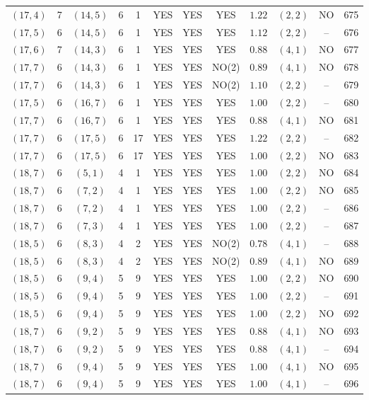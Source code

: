 \begin{longtable}{|c|c|c|c|c|c|c|c|c|c|c|c|}
$(17,4)$ & 7 & $(14,5)$ & 6 & 1 & YES & YES & YES & $1.22$ & $(2,2)$ & NO & 675\\
$(17,5)$ & 6 & $(14,5)$ & 6 & 1 & YES & YES & YES & $1.12$ & $(2,2)$ & -- & 676\\
$(17,6)$ & 7 & $(14,3)$ & 6 & 1 & YES & YES & YES & $0.88$ & $(4,1)$ & NO & 677\\
$(17,7)$ & 6 & $(14,3)$ & 6 & 1 & YES & YES & NO(2) & $0.89$ & $(4,1)$ & NO & 678\\
$(17,7)$ & 6 & $(14,3)$ & 6 & 1 & YES & YES & NO(2) & $1.10$ & $(2,2)$ & -- & 679\\
$(17,5)$ & 6 & $(16,7)$ & 6 & 1 & YES & YES & YES & $1.00$ & $(2,2)$ & -- & 680\\
$(17,7)$ & 6 & $(16,7)$ & 6 & 1 & YES & YES & YES & $0.88$ & $(4,1)$ & NO & 681\\
$(17,7)$ & 6 & $(17,5)$ & 6 & 17 & YES & YES & YES & $1.22$ & $(2,2)$ & -- & 682\\
$(17,7)$ & 6 & $(17,5)$ & 6 & 17 & YES & YES & YES & $1.00$ & $(2,2)$ & NO & 683\\
$(18,7)$ & 6 & $(5,1)$ & 4 & 1 & YES & YES & YES & $1.00$ & $(2,2)$ & NO & 684\\
$(18,7)$ & 6 & $(7,2)$ & 4 & 1 & YES & YES & YES & $1.00$ & $(2,2)$ & NO & 685\\
$(18,7)$ & 6 & $(7,2)$ & 4 & 1 & YES & YES & YES & $1.00$ & $(2,2)$ & -- & 686\\
$(18,7)$ & 6 & $(7,3)$ & 4 & 1 & YES & YES & YES & $1.00$ & $(2,2)$ & -- & 687\\
$(18,5)$ & 6 & $(8,3)$ & 4 & 2 & YES & YES & NO(2) & $0.78$ & $(4,1)$ & -- & 688\\
$(18,5)$ & 6 & $(8,3)$ & 4 & 2 & YES & YES & NO(2) & $0.89$ & $(4,1)$ & NO & 689\\
$(18,5)$ & 6 & $(9,4)$ & 5 & 9 & YES & YES & YES & $1.00$ & $(2,2)$ & NO & 690\\
$(18,5)$ & 6 & $(9,4)$ & 5 & 9 & YES & YES & YES & $1.00$ & $(2,2)$ & -- & 691\\
$(18,5)$ & 6 & $(9,4)$ & 5 & 9 & YES & YES & YES & $1.00$ & $(2,2)$ & NO & 692\\
$(18,7)$ & 6 & $(9,2)$ & 5 & 9 & YES & YES & YES & $0.88$ & $(4,1)$ & NO & 693\\
$(18,7)$ & 6 & $(9,2)$ & 5 & 9 & YES & YES & YES & $0.88$ & $(4,1)$ & -- & 694\\
$(18,7)$ & 6 & $(9,4)$ & 5 & 9 & YES & YES & YES & $1.00$ & $(4,1)$ & NO & 695\\
$(18,7)$ & 6 & $(9,4)$ & 5 & 9 & YES & YES & YES & $1.00$ & $(4,1)$ & -- & 696\\

\end{longtable}
